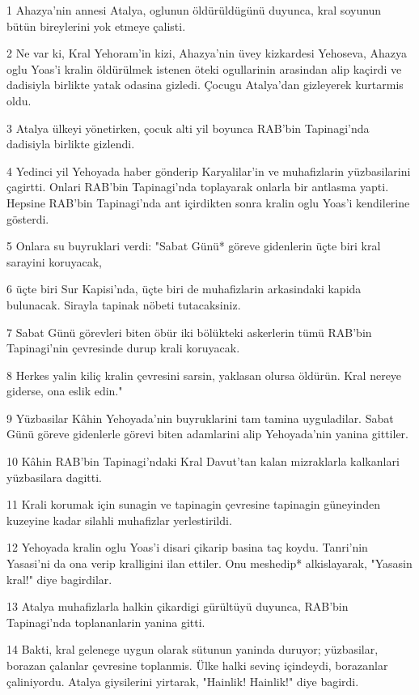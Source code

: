 \par 1 Ahazya'nin annesi Atalya, oglunun öldürüldügünü duyunca, kral soyunun bütün bireylerini yok etmeye çalisti.
\par 2 Ne var ki, Kral Yehoram'in kizi, Ahazya'nin üvey kizkardesi Yehoseva, Ahazya oglu Yoas'i kralin öldürülmek istenen öteki ogullarinin arasindan alip kaçirdi ve dadisiyla birlikte yatak odasina gizledi. Çocugu Atalya'dan gizleyerek kurtarmis oldu.
\par 3 Atalya ülkeyi yönetirken, çocuk alti yil boyunca RAB'bin Tapinagi'nda dadisiyla birlikte gizlendi.
\par 4 Yedinci yil Yehoyada haber gönderip Karyalilar'in ve muhafizlarin yüzbasilarini çagirtti. Onlari RAB'bin Tapinagi'nda toplayarak onlarla bir antlasma yapti. Hepsine RAB'bin Tapinagi'nda ant içirdikten sonra kralin oglu Yoas'i kendilerine gösterdi.
\par 5 Onlara su buyruklari verdi: "Sabat Günü* göreve gidenlerin üçte biri kral sarayini koruyacak,
\par 6 üçte biri Sur Kapisi'nda, üçte biri de muhafizlarin arkasindaki kapida bulunacak. Sirayla tapinak nöbeti tutacaksiniz.
\par 7 Sabat Günü görevleri biten öbür iki bölükteki askerlerin tümü RAB'bin Tapinagi'nin çevresinde durup krali koruyacak.
\par 8 Herkes yalin kiliç kralin çevresini sarsin, yaklasan olursa öldürün. Kral nereye giderse, ona eslik edin."
\par 9 Yüzbasilar Kâhin Yehoyada'nin buyruklarini tam tamina uyguladilar. Sabat Günü göreve gidenlerle görevi biten adamlarini alip Yehoyada'nin yanina gittiler.
\par 10 Kâhin RAB'bin Tapinagi'ndaki Kral Davut'tan kalan mizraklarla kalkanlari yüzbasilara dagitti.
\par 11 Krali korumak için sunagin ve tapinagin çevresine tapinagin güneyinden kuzeyine kadar silahli muhafizlar yerlestirildi.
\par 12 Yehoyada kralin oglu Yoas'i disari çikarip basina taç koydu. Tanri'nin Yasasi'ni da ona verip kralligini ilan ettiler. Onu meshedip* alkislayarak, "Yasasin kral!" diye bagirdilar.
\par 13 Atalya muhafizlarla halkin çikardigi gürültüyü duyunca, RAB'bin Tapinagi'nda toplananlarin yanina gitti.
\par 14 Bakti, kral gelenege uygun olarak sütunun yaninda duruyor; yüzbasilar, borazan çalanlar çevresine toplanmis. Ülke halki sevinç içindeydi, borazanlar çaliniyordu. Atalya giysilerini yirtarak, "Hainlik! Hainlik!" diye bagirdi.
